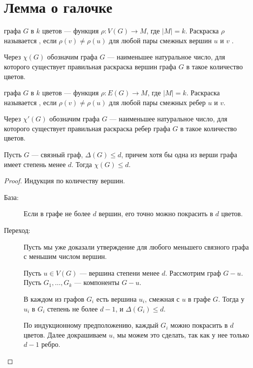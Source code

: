 \section{Лемма о галочке}
\begin{definition}
	 графа $G$ в  $k$ цветов --- функция $\rho\colon V(G) \to M$, где $\lvert M \rvert = k$. Раскраска $\rho$ называется , если $\rho(v) \neq \rho(u)$ для любой пары смежных вершин   $u$ и $v$ .

	Через $\chi(G)$ обозначим  графа $G$ --- наименьшее натуральное число, для которого существует правильная раскраска вершин графа $G$ в такое количество цветов.

	 графа $G$ в $k$ цветов --- функция $\rho\colon E(G) \to M$, где $\lvert M \rvert = k$. Раскраска называется , если $\rho(v) \neq \rho(u)$ для любой пары смежных ребер $u$ и $v$.

	Через $\chi'(G)$ обозначим  графа $G$ --- наименьшее натуральное число, для которого существует правильная раскраска ребер графа $G$ в такое количество цветов.
\end{definition}

\begin{lemma}\label{lm:coloring_1}
	Пусть $G$ --- связный граф, $\Delta(G) \le d$, причем хотя бы одна из верши графа имеет степень менее $d$. Тогда $\chi(G) \le d$.
\end{lemma}
\begin{proof}
    Индукция по количеству вершин.
	\begin{description}
		\item [База:] Если в графе не более $d$ вершин, его точно можно покрасить в $d$ цветов.
		\item [Переход:] Пусть мы уже доказали утверждение для любого меньшего связного графа с меньшим числом вершин.

			Пусть $u \in V(G)$ --- вершина степени менее $d$. Рассмотрим граф $G - u$. Пусть $G_1, \ldots , G_k  $ --- компоненты $G-u$.

			В каждом из графов $G_i$ есть вершина $u_i$, смежная с $u$ в графе $G$. Тогда у $u_i$ в $G_i$ степень не более $d-1$, и $\Delta(G_i) \le d$.

			По индукционному предположению, каждый $G_i$ можно покрасить в $d$ цветов. Далее докрашиваем $u$, мы можем это сделать, так как у нее только $d-1$ ребро.
	\end{description}
\end{proof}


